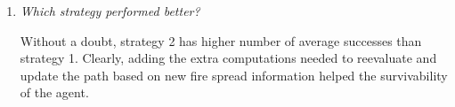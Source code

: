 \documentclass[12pt, twoside]{article}
\begin{document}
\begin{enumerate}
    \item 
        \textit{Which strategy performed better?}

        \vspace{4mm}
        Without a doubt, strategy 2 has higher number of average successes than strategy 1. Clearly, adding the extra computations needed to reevaluate and update the path based on new fire spread information helped the survivability of the agent. 


\end{enumerate}
 
 
\end{document}

